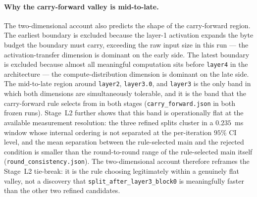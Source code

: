 \paragraph{Why the carry-forward valley is mid-to-late.}
The two-dimensional account also predicts the shape of the
carry-forward region. The earliest boundary is excluded because the
layer-1 activation expands the byte budget the boundary must carry,
exceeding the raw input size in this run --- the activation-transfer
dimension is dominant on the early side. The latest boundary is
excluded because almost all meaningful computation sits before
\texttt{layer4} in the architecture --- the compute-distribution
dimension is dominant on the late side. The mid-to-late region around
\texttt{layer2}, \texttt{layer3.0}, and \texttt{layer3} is the only
band in which both dimensions are simultaneously tolerable, and it is
the band that the carry-forward rule selects from in both stages
(\texttt{carry\_forward.json} in both frozen runs). Stage~L2 further
shows that this band is operationally flat at the available
measurement resolution: the three refined splits cluster in a
\(0.235\)~ms window whose internal ordering is not separated at the
per-iteration \(95\%\) CI level, and the mean separation between the
rule-selected main and the rejected condition is smaller than the
round-to-round range of the rule-selected main itself
(\texttt{round\_consistency.json}). The two-dimensional account
therefore reframes the Stage~L2 tie-break: it is the rule choosing
legitimately within a genuinely flat valley, not a discovery that
\texttt{split\_after\_layer3\_block0} is meaningfully faster than the
other two refined candidates.

